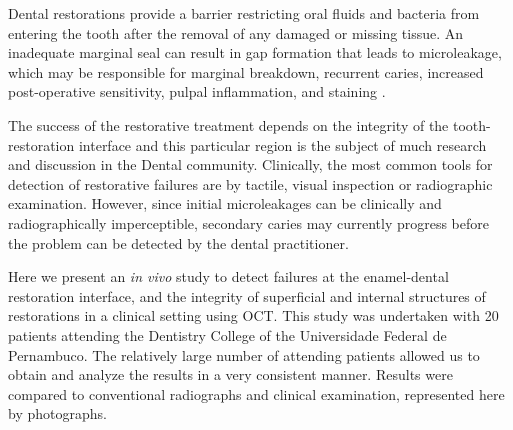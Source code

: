 \documentclass[12pt,twoside,english]{book}
\renewcommand{\~}{\perispomeni}%
\numberwithin{equation}{section}
\numberwithin{figure}{section}
\begin{document}

Dental restorations provide a barrier restricting oral fluids and bacteria from entering the tooth after the removal of any damaged or missing tissue. An inadequate marginal seal can result in gap formation that leads to microleakage, which may be responsible for marginal breakdown, recurrent caries, increased post-operative sensitivity, pulpal inflammation, and staining \cite{Attar:2008p2147}.

The success of the restorative treatment depends on the integrity of the tooth-restoration interface and this particular region is the subject of much research and discussion in the Dental community. Clinically, the most common tools for detection of restorative failures are by tactile, visual inspection or radiographic examination. However, since initial microleakages can be clinically and radiographically imperceptible, secondary caries may currently progress before the problem can be detected by the dental practitioner.

Here we present an \emph{in vivo} study to detect failures at the enamel-dental restoration interface, and the integrity of superficial and internal structures of restorations in a clinical setting using OCT. This study was undertaken with 20 patients attending the Dentistry College of the Universidade Federal de Pernambuco. The relatively large number of attending patients allowed us to obtain and analyze the results in a very consistent manner. Results were compared to conventional radiographs and clinical examination, represented here by photographs. 
\end{document}
